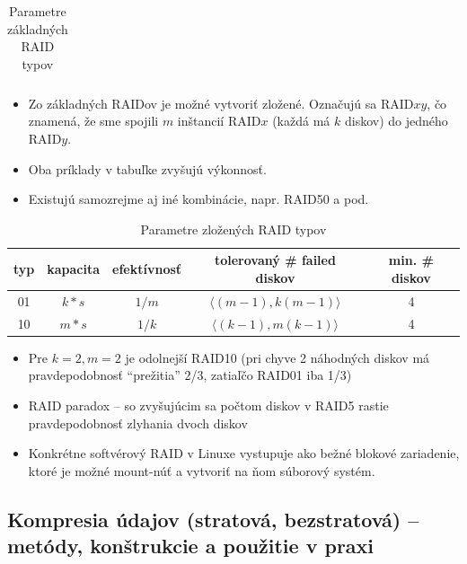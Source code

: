\documentclass[12pt,a4paper]{article}
\begin{document}
{\begin{table}[htbp]
\begin{tabular}{|c|c|c|c|c|}
        \end{tabular}
        \caption{Parametre základných RAID typov}
        \label{tab:my_label}
    \end{table}
    \begin{itemize}
        \item Zo základných RAIDov je možné vytvoriť zložené. Označujú sa RAID$xy$, čo znamená, že sme spojili $m$ inštancií RAID$x$ (každá má $k$ diskov) do jedného RAID$y$.
        \item Oba príklady v tabuľke zvyšujú výkonnosť.
        \item Existujú samozrejme aj iné kombinácie, napr. RAID50 a pod.
    \end{itemize}
    \begin{table}[htbp]
        \centering
        \begin{tabular}{|c|c|c|c|c|}
        \hline
            typ & kapacita & efektívnosť &  tolerovaný \# failed diskov & min. \# diskov \\\hline
            01 & $k*s$ & $1/m$ & $\langle (m-1), k(m-1)\rangle$ & 4 \\\hline
            10 & $m*s$ & $1/k$ & $\langle (k-1), m(k-1)\rangle$ & 4 \\\hline
        \end{tabular}
        \caption{Parametre zložených RAID typov}
        \label{tab:my_label}
    \end{table}
    \begin{itemize}
        \item Pre $k=2,m=2$ je odolnejší RAID10 (pri chyve 2 náhodných diskov má pravdepodobnosť ``prežitia'' 2/3, zatiaľčo RAID01 iba 1/3)
        \item RAID paradox -- so zvyšujúcim sa počtom diskov v RAID5 rastie pravdepodobnosť zlyhania dvoch diskov
        \item Konkrétne softvérový RAID v Linuxe vystupuje ako bežné blokové zariadenie, ktoré je možné mount-núť a vytvoriť na ňom súborový systém.
    \end{itemize}
    \subsection{Kompresia údajov (stratová, bezstratová) – metódy, konštrukcie a použitie v praxi}
}
\end{document}
